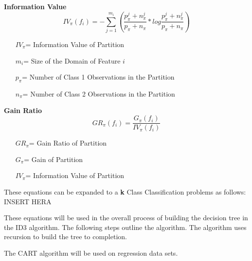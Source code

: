 \documentclass[twoside,11pt]{article}
\begin{document}
\textbf{Information Value}
\begin{equation}
	IV_\pi(f_i)  = -\sum_{j=1}^{m_i}(\frac{p_\pi^j + n_\pi^j}{p_\pi + n_\pi} * log\frac{p_\pi^j + n_\pi^j}{p_\pi + n_\pi})
\end{equation}
\begin{itemize}
	\item[$IV_\pi$=] Information Value of Partition
	\item[$m_i$=] Size of the Domain of Feature $i$
	\item[$p_\pi$=] Number of Class 1 Observations in the Partition
	\item[$n_\pi$=] Number of Class 2 Observations in the Partition
\end{itemize}


\textbf{Gain Ratio}
\begin{equation}
	GR_\pi(f_i)  = \frac{G_\pi(f_i)}{IV_\pi(f_i)}
\end{equation}
\begin{itemize}
	\item[$GR_\pi$=] Gain Ratio of Partition
	\item[$G_\pi$=] Gain of Partition
	\item[$IV_\pi$=] Information Value of Partition
\end{itemize}

These equations can be expanded to a \textbf{k} Class Classification problems as follows:\newline
INSERT HERA\newline

These equations will be used in the overall process of building the decision tree in the ID3 algorithm. The following steps outline the algorithm. The algorithm uses recursion to build the tree to completion. 




\newpage
The CART algorithm will be used on regression data sets. 
\end{document}
